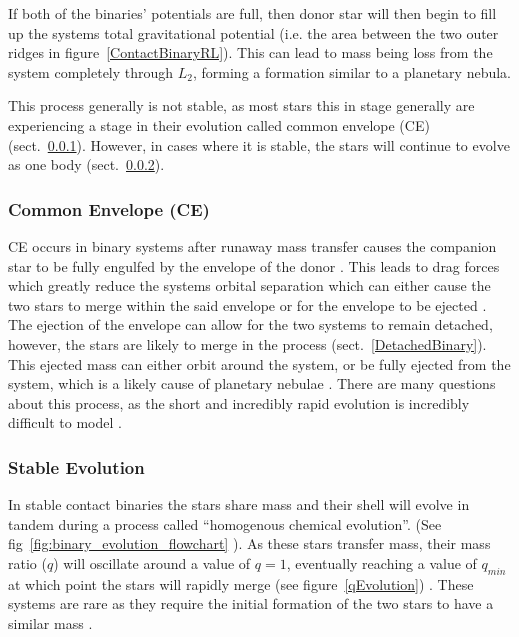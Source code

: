 \documentclass[12pt, a4paper]{article}
\begin{document}
        If both of the binaries' potentials are full, then donor star will then begin to fill up the systems total gravitational potential (i.e. the area between the two outer ridges in figure~\ref{ContactBinaryRL}). This can lead to mass being loss from the system completely \parencite{TaurisvandenHeuvel+2023} through $L_2$, forming a formation similar to a planetary nebula.
        
        This process generally is not stable, as most stars this in stage generally are experiencing a stage in their evolution called common envelope (CE) (sect.~\ref{CommonEnvelope}). However, in cases where it is stable, the stars will continue to evolve as one body (sect.~\ref{CommonEnvelopeStableEvoluton}).
        
        
        \subsubsection{Common Envelope (CE)}\label{CommonEnvelope}

            CE occurs in binary systems after runaway mass transfer causes  the companion star to be fully engulfed by the envelope of the donor \parencite{TaurisvandenHeuvel+2023}. This leads to drag forces which greatly reduce the systems orbital separation which can either cause the two stars to merge within the said envelope or for the envelope to be ejected \parencite{TaurisvandenHeuvel+2023}. The ejection of the envelope can allow for the two systems to remain detached, however, the stars are likely to merge in the process \parencite{TaurisvandenHeuvel+2023} (sect.~\ref{DetachedBinary}). This ejected mass can either orbit around the system, or be fully ejected from the system, which is a likely cause of planetary nebulae \parencite{TaurisvandenHeuvel+2023}. There are many questions about this process, as the short and incredibly rapid evolution is incredibly difficult to model \parencite{TaurisvandenHeuvel+2023}.

        \subsubsection{Stable Evolution}\label{CommonEnvelopeStableEvoluton}
            In stable contact binaries the stars share mass and their shell will evolve in tandem during a process called ``homogenous chemical evolution''. (See fig~\ref{fig:binary_evolution_flowchart} \parencite{Chen_2024}). As these stars transfer mass, their mass ratio ($q$) will oscillate around a value of $q=1$, eventually reaching a value of $q_{min}$ at which point the stars will rapidly merge (see figure~\ref{qEvolution}) \parencite{Pešta_2023}. These systems are rare as they require the initial formation of the two stars to have a similar mass \parencite{TaurisvandenHeuvel+2023}. 
            
\end{document}
